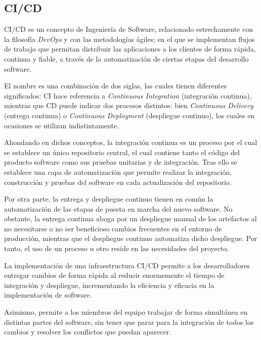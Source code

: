     \subsection{CI/CD}
        
        CI/CD es un concepto de Ingeniería de Software, relacionado estrechamente con la filosofía \textit{DevOps} y con las metodologías ágiles; en el que se implementan flujos de trabajo que permitan distribuir las aplicaciones a los clientes de forma rápida, continua y fiable, a través de la automatización de ciertas etapas del desarrollo software.
        
        El nombre es una combinación de dos siglas, las cuales tienen diferentes significados: CI hace referencia a \textit{Continuous Integration} (integración continua), mientras que CD puede indicar dos procesos distintos: bien \textit{Continuous Delivery} (entrega continua) o \textit{Continuous Deployment} (despliegue continuo), los cuales en ocasiones se utilizan indistintamente.
        
        Ahondando en dichos conceptos, la integración continua es un proceso por el cual se
        establece un único repositorio central, el cual contiene tanto el código del producto software como sus pruebas unitarias y de integración. Tras ello se establece una capa de automatización que permite realizar la integración, construcción y pruebas del software en cada actualización del repositorio. 
        
        Por otra parte, la entrega y despliegue continuo tienen en común la automatización de las etapas de puesta en marcha del nuevo software. No obstante, la entrega continua aboga por un despliegue manual de los artefactos al no necesitarse o no ser beneficioso cambios frecuentes en el entorno de producción, mientras que el despliegue continuo automatiza dicho despliegue. Por tanto, el uso de un proceso u otro reside en las necesidades del proyecto.
        
        La implementación de una infraestructura CI/CD permite a los desarrolladores entregar cambios de forma rápida al reducir enormemente el tiempo de integración y despliegue, incrementando la eficiencia y eficacia en la implementación de software. 
        
        Asimismo, permite a los miembros del equipo trabajar de forma simultánea en distintas partes del software, sin tener que parar para la integración de todos los cambios y resolver los conflictos que puedan aparecer.
    
